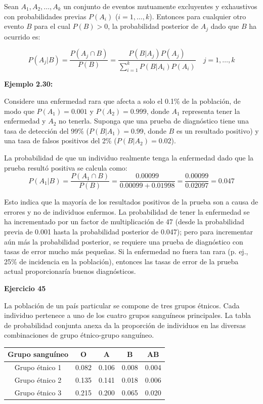 \documentclass[a4paper]{article}
\begin{document}
Sean $A_1, A_2, \dots, A_k$ un conjunto de eventos mutuamente excluyentes y exhaustivos con probabilidades previas $P(A_i)$ ($i = 1, \dots, k$). Entonces para cualquier otro evento $B$ para el cual $P(B) > 0$, la probabilidad posterior de $A_j$ dado que $B$ ha ocurrido es:

$$ P(A_j | B) = \frac{P(A_j \cap B)}{P(B)} = \frac{P(B | A_j)P(A_j)}{\sum_{i=1}^{k} P(B | A_i) P(A_i)} \quad j = 1, \dots, k $$

\textbf{Ejemplo 2.30:}

Considere una enfermedad rara que afecta a solo el 0.1\% de la población, de modo que $P(A_1) = 0.001$ y $P(A_2) = 0.999$, donde $A_1$ representa tener la enfermedad y $A_2$ no tenerla. Suponga que una prueba de diagnóstico tiene una tasa de detección del 99\% ($P(B | A_1) = 0.99$, donde $B$ es un resultado positivo) y una tasa de falsos positivos del 2\% ($P(B | A_2) = 0.02$).

La probabilidad de que un individuo realmente tenga la enfermedad dado que la prueba resultó positiva se calcula como:
$$ P(A_1 | B) = \frac{P(A_1 \cap B)}{P(B)} = \frac{0.00099}{0.00099 + 0.01998} = \frac{0.00099}{0.02097} = 0.047 $$

Esto indica que la mayoría de los resultados positivos de la prueba son a causa de errores y no de individuos enfermos. La probabilidad de tener la enfermedad se ha incrementado por un factor de multiplicación de 47 (desde la probabilidad previa de 0.001 hasta la probabilidad posterior de 0.047); pero para incrementar aún más la probabilidad posterior, se requiere una prueba de diagnóstico con tasas de error mucho más pequeñas. Si la enfermedad no fuera tan rara (p. ej., 25\% de incidencia en la población), entonces las tasas de error de la prueba actual proporcionaría buenos diagnósticos.

\textbf{Ejercicio 45}

La población de un país particular se compone de tres grupos étnicos. Cada individuo pertenece a uno de los cuatro grupos sanguíneos principales. La tabla de probabilidad conjunta anexa da la proporción de individuos en las diversas combinaciones de grupo étnico-grupo sanguíneo.

\begin{center}
\begin{tabular}{|c|c|c|c|c|}
\hline
\textbf{Grupo sanguíneo} & \textbf{O} & \textbf{A} & \textbf{B} & \textbf{AB} \\
\hline
Grupo étnico 1 & 0.082 & 0.106 & 0.008 & 0.004 \\
\hline
Grupo étnico 2 & 0.135 & 0.141 & 0.018 & 0.006 \\
\hline
Grupo étnico 3 & 0.215 & 0.200 & 0.065 & 0.020 \\
\hline
\end{tabular}
\end{center}
\end{document}
